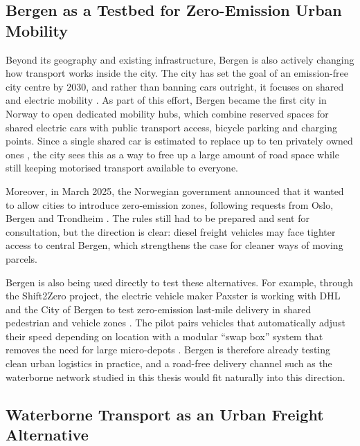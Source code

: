 \documentclass[12pt]{article}
\begin{document}
\subsection{Bergen as a Testbed for Zero-Emission Urban Mobility}
\label{subsec:zero-emission-mobility}

Beyond its geography and existing infrastructure, Bergen is also actively changing how transport works inside the city. The city has set the goal of an emission-free city centre by 2030, and rather than banning cars outright, it focuses on shared and electric mobility \parencite{investbergen_sharedmobility}. As part of this effort, Bergen became the first city in Norway to open dedicated mobility hubs, which combine reserved spaces for shared electric cars with public transport access, bicycle parking and charging points. Since a single shared car is estimated to replace up to ten privately owned ones \parencite{investbergen_sharedmobility}, the city sees this as a way to free up a large amount of road space while still keeping motorised transport available to everyone.

Moreover, in March 2025, the Norwegian government announced that it wanted to allow cities to introduce zero-emission zones, following requests from Oslo, Bergen and Trondheim \parencite{energymix_zez}. The rules still had to be prepared and sent for consultation, but the direction is clear: diesel freight vehicles may face tighter access to central Bergen, which strengthens the case for cleaner ways of moving parcels.

Bergen is also being used directly to test these alternatives. For example, through the Shift2Zero project, the electric vehicle maker Paxster is working with DHL and the City of Bergen to test zero-emission last-mile delivery in shared pedestrian and vehicle zones \parencite{paxster_shift2zero}. The pilot pairs vehicles that automatically adjust their speed depending on location with a modular ``swap box'' system that removes the need for large micro-depots \parencite{paxster_shift2zero}. Bergen is therefore already testing clean urban logistics in practice, and a road-free delivery channel such as the waterborne network studied in this thesis would fit naturally into this direction.

\subsection{Waterborne Transport as an Urban Freight Alternative}
\label{subsec:waterborne-urban-freight}
\end{document}
